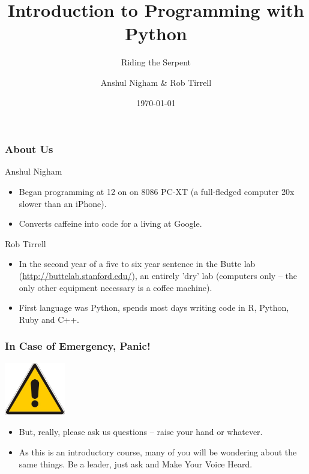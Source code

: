 \documentclass[10pt]{beamer}
\title{Introduction to Programming with Python}
\subtitle{Riding the Serpent}
\author{Anshul Nigham \& Rob Tirrell}
\date{\today}
\begin{document}
\begin{frame}
  \titlepage
\end{frame}

\begin{frame}
  \small
  \frametitle{About Us}
  \begin{block}{Anshul Nigham}
    \begin{itemize}
      \item Began programming at 12 on on 8086 PC-XT (a full-fledged computer 20x slower than an iPhone).
      \item Converts caffeine into code for a living at Google.
    \end{itemize}
  \end{block}
  \begin{block}{Rob Tirrell}
    \begin{itemize}
      \item In the second year of a five to six year sentence in the Butte lab (\href{http://buttelab.stanford.edu/}{http://buttelab.stanford.edu/}), an entirely 'dry' lab (computers only -- the only other equipment necessary is a coffee machine).
      \item First language was Python, spends most days writing code in R, Python, Ruby and C++.
    \end{itemize}
  \end{block}
\end{frame}

\begin{frame}
  \frametitle{In Case of Emergency, Panic!}
  \begin{center}
    \includegraphics[width=100px]{AlertSign.jpg}
  \end{center}
  \begin{itemize}
    \item But, really, please ask us questions -- raise your hand or whatever.
    \item As this is an introductory course, many of you will be wondering about the same things.
      Be a leader, just ask and Make Your Voice Heard.
  \end{itemize}
\end{frame}
\end{document}
